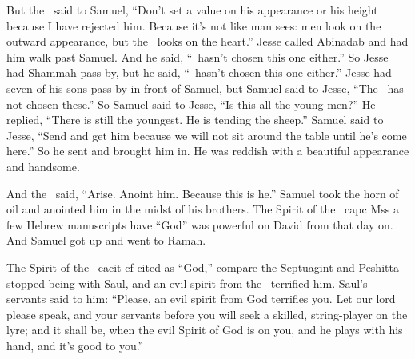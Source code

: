 \begin{inparaenum}
   But the \lord\ said to Samuel, ``Don't set a value on his appearance or his height because I have rejected him. Because it's not like man sees: men look on the outward appearance, but the \lord\ looks on the heart.''%
   Jesse called Abinadab and had him walk past Samuel. And he said, ``\lord\ hasn't chosen this one either.''%
   So Jesse had Shammah pass by, but he said, ``\lord\ hasn't chosen this one either.''%
   Jesse had seven of his sons pass by in front of Samuel, but Samuel said to Jesse, ``The \lord\ has not chosen these.''%
   So Samuel said to Jesse, ``Is this all the young men?'' He replied, ``There is still the youngest. He is tending the sheep.'' Samuel said to Jesse, ``Send and get him because we will not sit around the table until he's come here.''%
   So he sent and brought him in. He was reddish with a beautiful appearance and handsome.%
  
  And the \lord\ said, ``Arise. Anoint him. Because this is he.''%
   Samuel took the horn of oil and anointed him in the midst of his brothers. The Spirit of the \lord\ ca{pc Mss }{a few Hebrew manuscripts have ``God''} was powerful on David from that day on. And Samuel got up and went to Ramah.%
  
   The Spirit of the \lord\ ca{cit  cf \septuagint{}\peshitta}{cited as ``God,'' compare the Septuagint and Peshitta} stopped being with Saul, and an evil spirit from the \lord\ terrified him.%
   Saul's servants said to him: ``Please, an evil spirit from God terrifies you.%
   Let our lord please speak, and your servants before you will seek a skilled, string-player on the lyre; and it shall be, when the evil Spirit of God is on you, and he plays with his hand, and it's good to you.''%
  

\end{inparaenum}
